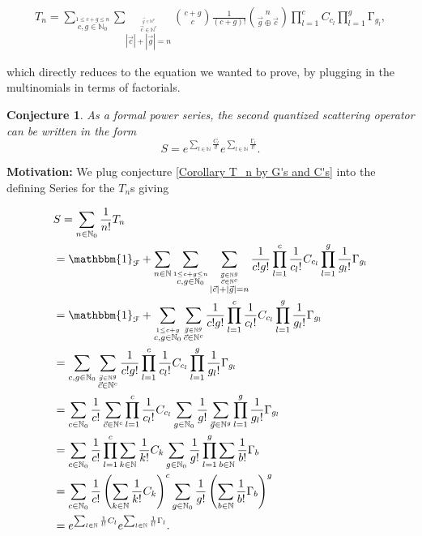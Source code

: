 \documentclass[b5paper,draft,openbib,12pt]{memoir}
\newtheorem{Conj}[Def]{Conjecture}
\newcommand{\id}{\mathbbm{1}}
\begin{document}
\begin{multline}
T_n = \sum_{\stackrel{1\le c+g\le n}{c,g\in\mathbb{N}_0}}
\sum_{\stackrel{\stackrel{\vec{g}\in\mathbb{N}^g}{\vec{c}\in\mathbb{N}^c}}{|\vec{c}| + |\vec{g}|=n}} 
\binom{c+g}{c} \frac{1}{(c+g)!} \binom{n}{\vec{g}\oplus \vec{c}}
\prod_{l=1}^c  C_{c_l} \prod_{l=1}^g \mathrm\Gamma_{g_l},
\end{multline}

which directly reduces to the equation we wanted to prove, by plugging in the multinomials in terms of
factorials. 

\begin{Conj}
As a formal power series, the second quantized scattering operator can be written in the form
\begin{equation}\label{Corollary double exp}
S= e^{\sum_{l\in\mathbb{N}} \frac{C_{l}}{l!}}
 e^{\sum_{l\in\mathbb{N}} \frac{\mathrm\Gamma_{l}}{l!}}.
\end{equation}
\end{Conj}
\textbf{Motivation:} We plug conjecture \ref{Corollary T_n by G's and C's} into the defining Series for the \(T_n\)s
giving

\begin{align}
&S= \sum_{n\in\mathbb{N}_0} \frac{1}{n!} T_n \\
&=\id_{\mathcal{F}}+ \sum_{n\in\mathbb{N}} \sum_{\stackrel{1\le c+g\le n}{c,g\in\mathbb{N}_0}} 
\sum_{\stackrel{\stackrel{\vec{g}\in\mathbb{N}^g}{\vec{c}\in\mathbb{N}^c}}{|\vec{c}| + |\vec{g}|=n}} 
\frac{1}{c! g!} \prod_{l=1}^c \frac{1}{c_l!} C_{c_l} \prod_{l=1}^g \frac{1}{g_l!} \mathrm\Gamma_{g_l}\\
&=\id_{\mathcal{F}}+  \sum_{\stackrel{1\le c+g }{c,g\in\mathbb{N}_0}} 
\sum_{\stackrel{\vec{g}\in\mathbb{N}^g}{\vec{c}\in\mathbb{N}^c}} 
\frac{1}{c! g!} \prod_{l=1}^c \frac{1}{c_l!} C_{c_l} \prod_{l=1}^g \frac{1}{g_l!} \mathrm\Gamma_{g_l}\\
&=\sum_{c,g\in\mathbb{N}_0}
\sum_{\stackrel{\vec{g}\in\mathbb{N}^g}{\vec{c}\in\mathbb{N}^c}} 
\frac{1}{c! g!} \prod_{l=1}^c \frac{1}{c_l!} C_{c_l} \prod_{l=1}^g \frac{1}{g_l!} \mathrm\Gamma_{g_l}\\
&=\sum_{c\in\mathbb{N}_0} \frac{1}{c!} \sum_{\vec{c}\in\mathbb{N}^c} \prod_{l=1}^c \frac{1}{c_l!} C_{c_l}
\sum_{g\in\mathbb{N}_0} \frac{1}{g!} \sum_{\vec{g}\in\mathbb{N}^g} \prod_{l=1}^g \frac{1}{g_l!} \mathrm\Gamma_{g_l}\\
&=\sum_{c\in\mathbb{N}_0} \frac{1}{c!} \prod_{l=1}^c \sum_{k\in\mathbb{N}} \frac{1}{k!} C_{k}
\sum_{g\in\mathbb{N}_0} \frac{1}{g!}  \prod_{l=1}^g \sum_{b\in\mathbb{N}} \frac{1}{b!} \mathrm\Gamma_{b}\\
&=\sum_{c\in\mathbb{N}_0} \frac{1}{c!} \left( \sum_{k\in\mathbb{N}} \frac{1}{k!} C_{k}\right)^c
\sum_{g\in\mathbb{N}_0} \frac{1}{g!}  \left( \sum_{b\in\mathbb{N}} \frac{1}{b!} \mathrm\Gamma_{b}\right)^g\\
&=e^{\sum_{l\in\mathbb{N}} \frac{1}{l!} C_{l}} e^{\sum_{l\in\mathbb{N}} \frac{1}{l!} \mathrm\Gamma_{l}}.
\end{align}
\end{document}
